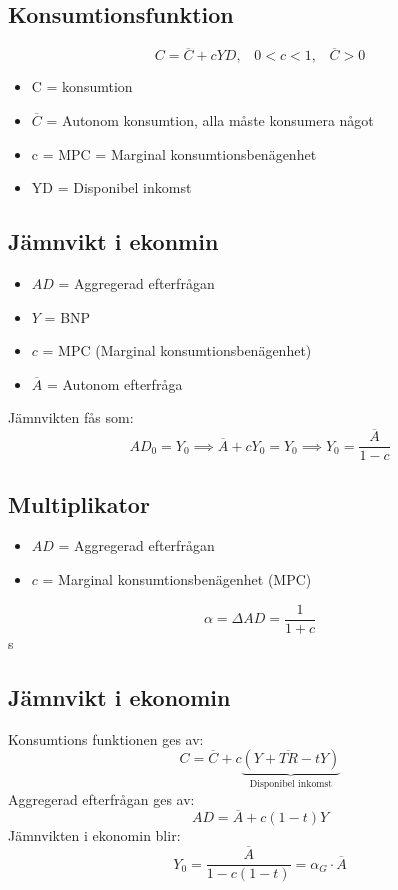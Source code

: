 \documentclass[12pt,a4paper]{article}
\begin{document}
\subsection*{Konsumtionsfunktion}
$$C = \overline{C} + cYD, \hspace{10pt} 0 < c < 1, \hspace{10pt} \overline{C} > 0$$
\begin{itemize}
    \item C = konsumtion
    \item $\overline{C}$ = Autonom konsumtion, alla måste konsumera något
    \item c = MPC = Marginal konsumtionsbenägenhet
    \item YD = Disponibel inkomst
\end{itemize}

\subsection*{Jämnvikt i ekonmin}
\begin{itemize}
    \item $AD$ = Aggregerad efterfrågan
    \item $Y$ = BNP
    \item $c$ = MPC (Marginal konsumtionsbenägenhet)
    \item $\overline{A}$ = Autonom efterfråga
\end{itemize}
Jämnvikten fås som:
$$AD_0 = Y_0 \implies \overline{A} + cY_0 = Y_0 \implies Y_0 = \frac{\overline{A}}{1 - c}$$

\subsection*{Multiplikator}
\begin{itemize}
    \item $AD$ = Aggregerad efterfrågan
    \item $c$ = Marginal konsumtionsbenägenhet (MPC)
\end{itemize}

$$\alpha = \Delta AD = \frac{1}{1+c}$$s

\subsection*{Jämnvikt i ekonomin}
\noindent Konsumtions funktionen ges av:
$$C = \overline{C} + c\underbrace{(Y + \overline{TR} - tY)}_{\text{Disponibel inkomst}}$$
\noindent Aggregerad efterfrågan ges av:
$$AD = \overline{A} + c(1-t)Y$$
\noindent Jämnvikten i ekonomin blir:
$$Y_0 = \frac{\overline{A}}{1 - c(1-t)} = \alpha_G \cdot \overline{A}$$
\end{document}

